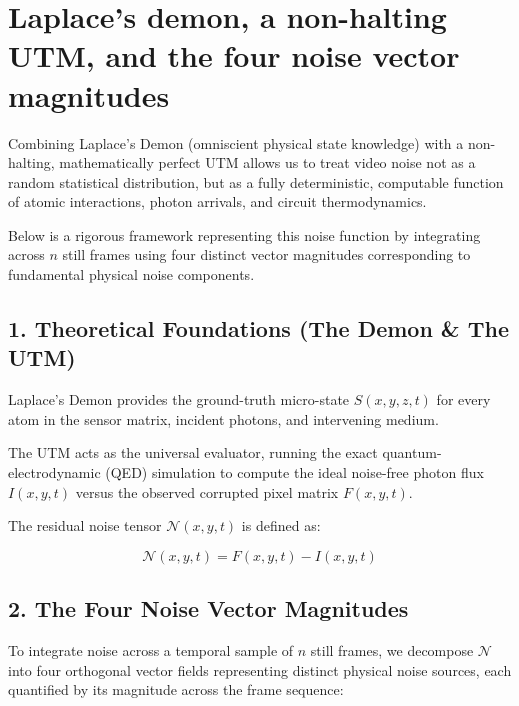 \chapter{\texorpdfstring{Laplace's demon, a non-halting UTM, and the four noise vector magnitudes}{Laplace's demon, a non-halting UTM, and the four noise vector magnitudes}}
\label{chap:demon-utm-four-noise-vectors}

Combining Laplace's Demon (omniscient physical state knowledge) with a non-halting, mathematically perfect UTM allows us to treat video noise not as a random statistical distribution, but as a fully deterministic, computable function of atomic interactions, photon arrivals, and circuit thermodynamics.

Below is a rigorous framework representing this noise function by integrating across \(n\) still frames using four distinct vector magnitudes corresponding to fundamental physical noise components.

\section{\texorpdfstring{1. Theoretical Foundations (The Demon \& The UTM)}{1. Theoretical Foundations (The Demon \& The UTM)}}

Laplace's Demon provides the ground-truth micro-state \(S(x,y,z,t)\) for every atom in the sensor matrix, incident photons, and intervening medium.

The UTM acts as the universal evaluator, running the exact quantum-electrodynamic (QED) simulation to compute the ideal noise-free photon flux \(I(x, y, t)\) versus the observed corrupted pixel matrix \(F(x, y, t)\).

The residual noise tensor \(\mathcal{N}(x, y, t)\) is defined as:

\[
\mathcal{N}(x, y, t) = F(x, y, t) - I(x, y, t)
\]

\section{\texorpdfstring{2. The Four Noise Vector Magnitudes}{2. The Four Noise Vector Magnitudes}}

To integrate noise across a temporal sample of \(n\) still frames, we decompose \(\mathcal{N}\) into four orthogonal vector fields representing distinct physical noise sources, each quantified by its magnitude across the frame sequence:

